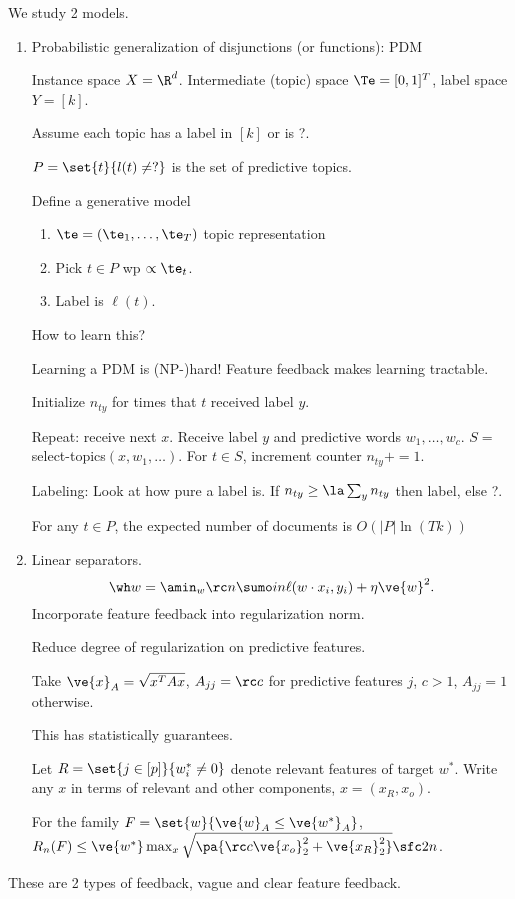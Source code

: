 We study 2 models.
\begin{enumerate}
\item
Probabilistic generalization of disjunctions (or functions): PDM

Instance space $X=\R^d$. Intermediate (topic) space $\Te=[0,1]^T$, label space $Y = [k]$. 

Assume each topic has a label in $[k]$ or is ?.

$P=\set{t}{l(t)\ne ?}$ is the set of predictive topics.

Define a generative model
\begin{enumerate}
\item
$\te=(\te_1,\ldots, \te_T)$ topic representation
\item
Pick $t\in P$ wp $\propto\te_t$.
\item
Label is $\ell(t)$.
\end{enumerate}
How to learn this? 

Learning a PDM is (NP-)hard! Feature feedback makes learning tractable. 

Initialize $n_{ty}$ for times that $t$ received label $y$.

Repeat: receive next $x$. Receive label $y$ and predictive words $w_1,\ldots, w_c$. $S=$select-topics$(x,w_1,\ldots)$. For $t\in S$, increment counter $n_{ty}+=1$.

Labeling: 
Look at how pure a label is.
If $n_{ty}\ge \la \sum_y n_{ty}$ then label, else ?.

For any $t\in P$, the expected number of documents is $O(|P|\ln(Tk))$
\item
Linear separators. 
$$
\wh w = \amin_w \rc n\sumo in \ell(w\cdot x_i,y_i) + \eta\ve{w}^2.
$$
Incorporate feature feedback into regularization norm.

Reduce degree of regularization on predictive features.

Take $\ve{x}_A = \sqrt{x^TAx}$, $A_{jj}=\rc c$ for predictive features $j$, $c>1$, $A_{jj}=1$ otherwise.

This has statistically guarantees. 

Let $R=\set{j\in[p]}{w_i^*\ne 0}$ denote relevant features of target $w^*$. Write any $x$ in terms of relevant and other components, $x=(x_R,x_o)$. 

For the family $F=\set{w}{\ve{w}_A\le \ve{w^*}_A}$, $R_n(F) \le \ve{w^*}\max_x\sqrt{\pa{\rc c\ve{x_o}_2^2 +\ve{x_R}_2^2}}\sfc 2n$.
\end{enumerate}
These are 2 types of feedback, vague and clear feature feedback. 

